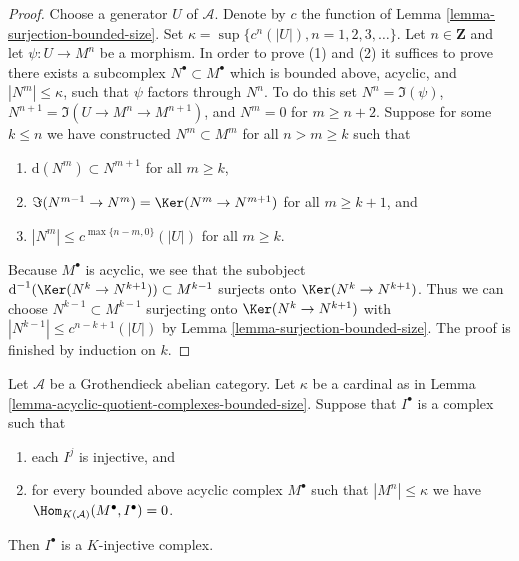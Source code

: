 \begin{proof}
Choose a generator $U$ of $\mathcal{A}$. Denote by $c$ the function of
Lemma \ref{lemma-surjection-bounded-size}.
Set $\kappa = \sup \{c^n(|U|), n = 1, 2, 3, \ldots\}$.
Let $n \in \mathbf{Z}$ and let $\psi : U \to M^n$ be a morphism.
In order to prove (1) and (2) it suffices to prove there exists a subcomplex
$N^\bullet \subset M^\bullet$ which is bounded above, acyclic, and
$|N^m| \leq \kappa$, such that $\psi$ factors through $N^n$.
To do this set $N^n = \Im(\psi)$, $N^{n + 1} = \Im(U \to M^n \to M^{n + 1})$,
and $N^m = 0$ for $m \geq n + 2$.
Suppose for some $k \leq n$ we have constructed $N^m \subset M^m$
for all $n > m \geq k$ such that
\begin{enumerate}
\item $\text{d}(N^m) \subset N^{m + 1}$ for all $m \geq k$,
\item $\Im(N^{m - 1} \to N^m) = \Ker(N^m \to N^{m + 1})$ for
all $m \geq k + 1$, and
\item $|N^m| \leq c^{\max\{n - m, 0\}}(|U|)$ for all $m \geq k$.
\end{enumerate}
Because $M^\bullet$ is acyclic, we see that the subobject
$\text{d}^{-1}(\Ker(N^k \to N^{k + 1})) \subset M^{k - 1}$ surjects onto
$\Ker(N^k \to N^{k + 1})$. Thus we can choose $N^{k - 1} \subset M^{k - 1}$
surjecting onto $\Ker(N^k \to N^{k + 1})$ with
$|N^{k - 1}| \leq c^{n - k + 1}(|U|)$ by
Lemma \ref{lemma-surjection-bounded-size}. The proof is finished by
induction on $k$.
\end{proof}

\begin{lemma}
\label{lemma-characterize-K-injective}
Let $\mathcal{A}$ be a Grothendieck abelian category.
Let $\kappa$ be a cardinal as in
Lemma \ref{lemma-acyclic-quotient-complexes-bounded-size}.
Suppose that $I^\bullet$ is a complex such that
\begin{enumerate}
\item each $I^j$ is injective, and
\item for every bounded above acyclic complex $M^\bullet$
such that $|M^n| \leq \kappa$
we have $\Hom_{K(\mathcal{A})}(M^\bullet, I^\bullet) = 0$.
\end{enumerate}
Then $I^\bullet$ is a $K$-injective complex.
\end{lemma}


